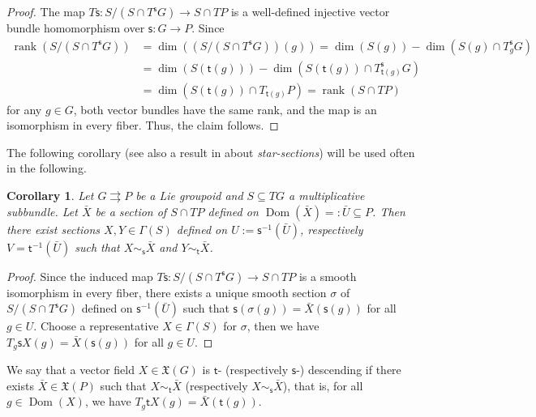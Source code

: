 \documentclass{amsart}
\newtheorem{corollary}[theorem]{Corollary}
\theoremstyle{definition}
\begin{document}
\begin{proof}
The map $T{{\mathsf{s}}}:S/(S\cap T^{{\mathsf{s}}} G)\to S\cap TP$
is a well-defined  injective  
vector bundle homomorphism over ${{\mathsf{s}}}:G\to P$. 
Since 
\begin{align*}
\operatorname{rank}(S/(S\cap T^{{\mathsf{s}}} G))&=\dim((S/(S\cap T^{{\mathsf{s}}} G))(g))=\dim(S(g))-\dim(S(g)\cap T_g^{{\mathsf{s}}} G)\\
&=\dim(S({{\mathsf{t}}}(g)))-\dim(S({{\mathsf{t}}}(g))\cap T_{{{\mathsf{t}}}(g)}^{{\mathsf{s}}} G)\\
&=\dim(S({{\mathsf{t}}}(g))\cap T_{{{\mathsf{t}}}(g)}P)=\operatorname{rank}(S\cap TP)
\end{align*}
for any $g\in G$,
both vector bundles have the same rank, 
and the map is an isomorphism in every fiber. Thus, the claim follows.
\end{proof}

The following corollary (see also a result
in \cite{Mackenzie00} about \emph{star-sections}) will be used often in the following.
\begin{corollary}\label{trelated}
Let $G{{\rightrightarrows}} P$ be a Lie groupoid and $S\subseteq TG$ a multiplicative subbundle.
Let $\bar X$ be a section of $S\cap TP$ defined
on $\operatorname{Dom}(\bar X)=:\bar U\subseteq P$. Then there exist
sections $X,Y \in\Gamma(S)$ defined on $U:={{\mathsf{s}}}{^{-1}}(\bar U)$,
respectively $V={{\mathsf{t}}}{^{-1}}(\bar U)$ 
such that 
$X\sim_{{\mathsf{s}}} \bar X$ and $Y\sim_{{\mathsf{t}}} \bar X$. 
\end{corollary}

\begin{proof}
Since the induced  map $T{{\mathsf{s}}}:S/(S\cap T^{{\mathsf{s}}} G)\to S\cap TP$ is a 
smooth isomorphism
in every fiber, there exists a unique 
smooth section $\sigma$ of 
$S/(S\cap T^{{\mathsf{s}}} G)$ defined on ${{\mathsf{s}}}{^{-1}}(\bar U)$
such that ${{\mathsf{s}}}(\sigma(g))=\bar X({{\mathsf{s}}}(g))$
for all $g\in U$. Choose a representative 
$X\in\Gamma(S)$ for $\sigma$, then we have 
$T_g{{\mathsf{s}}} X(g)=\bar X({{\mathsf{s}}}(g))$ for all $g\in U$.
\end{proof}

We say that a vector field $X\in{\mathfrak{X}}(G)$ is ${{\mathsf{t}}}$- (respectively ${{\mathsf{s}}}$-)
descending
if there exists $\bar X\in{\mathfrak{X}}(P)$ such that
$X\sim_{{\mathsf{t}}} \bar X$ (respectively $X\sim_{{\mathsf{s}}}\bar X$),
that is, for all $g\in\operatorname{Dom}(X)$, we have 
$T_g{{\mathsf{t}}} X(g)=\bar X({{\mathsf{t}}}(g))$.
 
\end{document}
